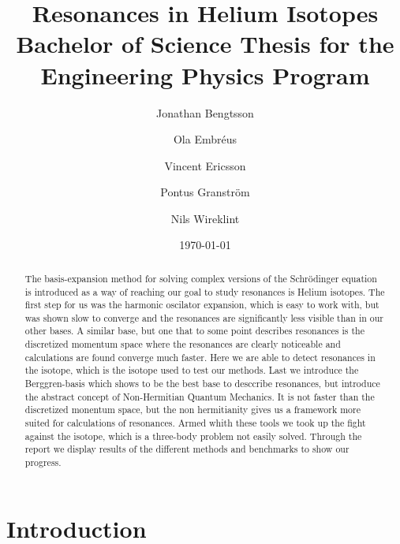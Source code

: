 \documentclass[12pt,a4paper]{report}
\begin{document}
  

\listoftodos

\title{Resonances in Helium Isotopes\\ 
\large Bachelor of Science Thesis for the Engineering Physics Program}
\author{Jonathan Bengtsson  \and Ola Embréus \and Vincent Ericsson \and Pontus Granström \and Nils Wireklint}
\date{\today}



\maketitle

\newpage
\begin{abstract}
The basis-expansion method for solving complex versions of the Schrödinger equation is introduced as a way of reaching our goal to study resonances is Helium isotopes.
The first step for us was the harmonic oscilator expansion, which is easy to work with, but was shown slow to converge and the resonances are significantly less visible than in our other bases.
A similar base, but one that to some point describes resonances is the discretized momentum space where the resonances are clearly noticeable and calculations are found converge much faster.
Here we are able to detect resonances in the  isotope, which is the isotope used to test our methods.
Last we introduce the Berggren-basis which shows to be the best base to desccribe resonances, but introduce the abstract concept of Non-Hermitian Quantum Mechanics.
It is not faster than the discretized monentum space, but the non hermitianity gives us a framework more suited for calculations of resonances.
Armed whith these tools we took up the fight against the  isotope, which is a three-body problem not easily solved.
Through the report we display results of the different methods and benchmarks to show our progress.

\end{abstract}
\newpage

\tableofcontents


\newpage

\setcounter{page}{1}

\chapter{Introduction}
\label{cha:introduction}

\end{document}

